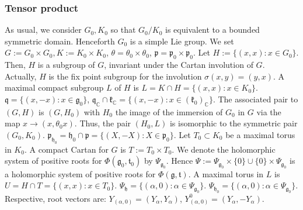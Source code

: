 \documentclass[12pt]{amsart}
\theoremstyle{definition}
\theoremstyle{remark}
\newcommand{\g}{\mathfrak{g}}
\newcommand{\h}{\mathfrak{h}}
\renewcommand{\k}{{\mathfrak k}}
\newcommand{\p}{\mathfrak p}
\newcommand{\q}{\mathfrak q}
\renewcommand{\t}{{\mathfrak t}}
\newcommand{\C}{{\mathbb C}}
\numberwithin{equation}{section}
\begin{document}
\subsubsection{{\bf Tensor product}} \label{sub:tensorpro}As usual, we consider $G_0,K_0$ so that $G_0/K_0$ is
equivalent to a bounded symmetric domain. Henceforth $G_0$ is a simple Lie group. We set $G := G_0\times G_0, K:=K_0\times K_0$,
   $\theta =\theta_0 \times \theta_0$, $\p =\p_0 \times \p_0$. Let $H:=\{(x,x): x\in G_0 \}$. Then, $H$ is a subgroup of $G$, invariant under the Cartan involution of $G$. Actually, $H$ is the fix point subgroup for the involution $\sigma(x,y)=(y,x)$. A maximal compact subgroup $L$ of $H$ is $L=K\cap H=\{(x,x): x\in K_0 \}$. $\q=\{(x,-x): x\in \g_0 \}$, $\q_\C \cap \k_\C=\{(x,-x): x\in (\k_0)_\C \}$.  The associated pair  to $(G,H)$ is $(G, H_0)$ with $H_0$ the image of the immersion of $G_0$ in $G$ via the map $x \rightarrow (x, \theta_0 x).$   Thus, the pair $(H_0, L)$ is isomorphic to the symmetric pair $(G_0, K_0).$  $\p_{\h_0}=\h_0 \cap \p=\{ (X,-X): X \in \p_0 \}$. Let $T_0 \subset K_0$ be a maximal torus in $K_0$.  A compact Cartan for $G$ is $T:=T_0 \times T_0$.   We denote the holomorphic system of positive roots    for $\Phi(\g_0, \t_0) $ by $\Psi_{\g_0}$. Hence $\Psi := \Psi_{\g_0} \times \{0\} \cup \{0\} \times \Psi_{\g_0}$ is a holomorphic system of positive roots for $\Phi(\g, \t) $. A maximal torus in $L$ is $U=H\cap T= \{(x,x): x\in T_0 \}$. $\Psi_\h =\{(\alpha, 0): \alpha \in \Psi_{\g_0} \}$. $\Psi_{\h_0} =\{(\alpha, 0): \alpha \in \Psi_{\g_0} \}$. Respective, root vectors are:
$Y_{(\alpha, 0)}=(Y_\alpha, Y_\alpha)$, $Y_{(\alpha, 0)}^0=(Y_\alpha, -Y_{\alpha})$.
\end{document}
